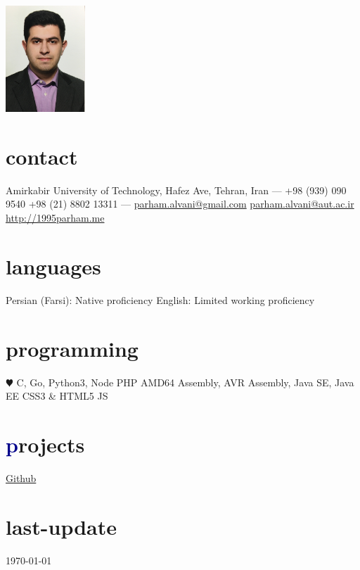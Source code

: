 \documentclass[]{friggeri-cv} %
\begin{document}


\begin{aside} %
	\includegraphics[width=3cm, height=4cm]{../parham_alvani_pers.jpg}
	\section{\textcolor{TextYellow}{c}ontact}
	Amirkabir University of Technology,
	Hafez Ave,
	Tehran, Iran
	---
	+98 (939) 090 9540
	+98 (21) 8802 13311
	---
	\href{mailto:parham.alvani@gmail.com}{parham.alvani@gmail.com}
	\href{mailto:parham.alvani@aut.ac.ir}{parham.alvani@aut.ac.ir}
	\href{http://1995parham.me/}{http://1995parham.me}
	\section{\textcolor{TextOrange}{l}anguages}
	Persian (Farsi):
	Native proficiency
	English:
	Limited working proficiency
	\section{\textcolor{TextGreen}{p}rogramming}
	{\color{red} $\varheartsuit$} C, Go, Python3, Node
	PHP
	AMD64 Assembly,
	AVR Assembly,
	Java SE, Java EE
	CSS3 \& HTML5
	JS
	\section{\textcolor{DarkBlue}{p}rojects}
	\href{https://github.com/1995parham}{\textcolor{TextGreen}{Github}}
	\section{\textcolor{Ocean}{last}-update}
	\today
\end{aside}
\end{document}
